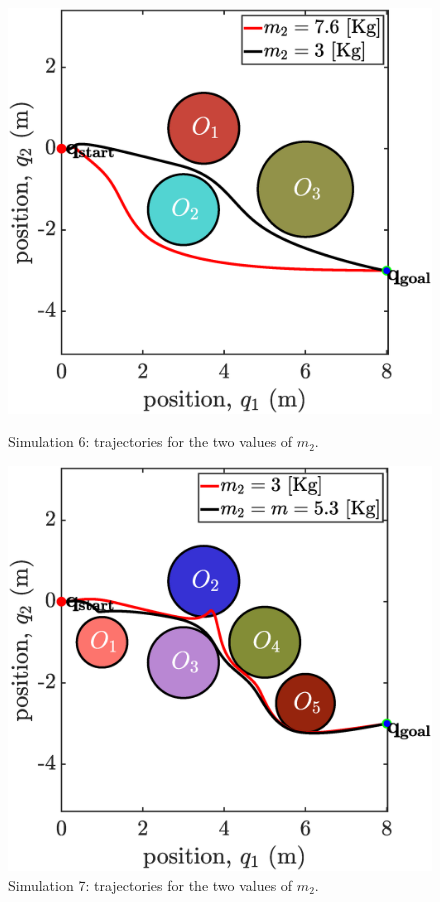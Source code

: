 \begin{figure}[!ht]
    \begin{minipage}[b]{0.46\linewidth}
    \includegraphics[width=\textwidth]{figures/sim6map.eps}
    \caption{\label{fig:sim6map}Simulation 6: trajectories for the two values of $m_2$.}
    \end{minipage}
    \hfill
    \begin{minipage}[b]{0.46\linewidth}
    \includegraphics[width=\textwidth]{figures/sim7map.eps}
    \caption{\label{fig:sim7map}Simulation 7: trajectories for the two values of $m_2$.}
    \end{minipage}
\end{figure}
